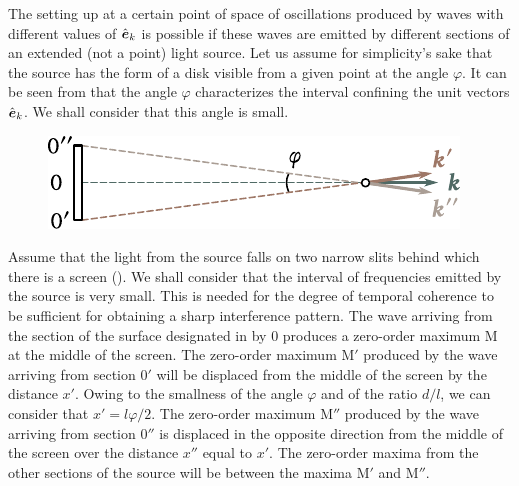 The setting up at a certain point of space of oscillations produced by waves with different values of $\hat{\boldsymbol{e}}_{k}$ is possible if these waves are emitted by different sections of an extended (not a point) light source.
Let us assume for simplicity's sake that the source has the form of a disk visible from a given point at the angle $\varphi$.
It can be seen from  that the angle $\varphi$ characterizes the interval confining the
unit vectors $\hat{\boldsymbol{e}}_{k}$.
We shall consider that this angle is small.

\begin{figure}[t]
	\begin{center}
		\includegraphics[scale=1]{figures/ch_17/fig_17_6.pdf}
		\caption[]{}
		\label{fig:17_6}
	\end{center}
	\vspace{-0.9cm}
\end{figure}

Assume that the light from the source falls on two narrow slits behind which there is a screen ().
We shall consider that the interval of frequencies emitted by the source is very small.
This is needed for the degree of temporal coherence to be sufficient for obtaining a sharp interference pattern.
The wave arriving from the section of the surface designated in  by $0$ produces a zero-order maximum M at the middle of the screen.
The zero-order maximum M$'$ produced by the wave arriving from section $0'$ will be displaced from the middle of the screen by the distance $x'$.
Owing to the smallness of the angle $\varphi$ and of the ratio $d/l$, we can consider that $x' = l\varphi/2$.
The zero-order maximum M$''$ produced by the wave arriving from section $0''$ is displaced in the opposite direction from the middle of the screen over the distance $x''$ equal to $x'$.
The zero-order maxima from the other sections of the source will be between the maxima M$'$ and M$''$.

